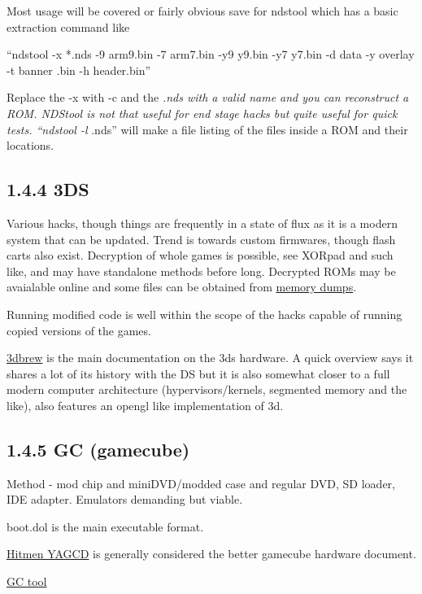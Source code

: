 \documentclass[
]{book}
\begin{document}
Most usage will be covered or fairly obvious save for ndstool which has a basic extraction command like

``ndstool -x *.nds -9 arm9.bin -7 arm7.bin -y9 y9.bin -y7 y7.bin -d data -y overlay -t banner .bin -h header.bin''

Replace the -x with -c and the \emph{.nds with a valid name and you can reconstruct a ROM. NDStool is not that useful for end stage hacks but quite useful for quick tests. ``ndstool -l }.nds'' will make a file listing of the files inside a ROM and their locations.

\hypertarget{ds-1}{%
\subsection{1.4.4 3DS}\label{ds-1}}

Various hacks, though things are frequently in a state of flux as it is a modern system that can be updated. Trend is towards custom firmwares, though flash carts also exist. Decryption of whole games is possible, see XORpad and such like, and may have standalone methods before long. Decrypted ROMs may be avaialable online and some files can be obtained from \href{http://gbatemp.net/threads/3ds-cwav-dumper.361437/}{memory dumps}.

Running modified code is well within the scope of the hacks capable of running copied versions of the games.

\href{http://3dbrew.org/wiki/Main_Page}{3dbrew} is the main documentation on the 3ds hardware. A quick overview says it shares a lot of its history with the DS but it is also somewhat closer to a full modern computer architecture (hypervisors/kernels, segmented memory and the like), also features an opengl like implementation of 3d.

\hypertarget{gc-gamecube}{%
\subsection{1.4.5 GC (gamecube)}\label{gc-gamecube}}

Method - mod chip and miniDVD/modded case and regular DVD, SD loader, IDE adapter. Emulators demanding but viable.

boot.dol is the main executable format.

\href{http://hitmen.c02.at/files/yagcd/yagcd/frames.html}{Hitmen YAGCD} is generally considered the better gamecube hardware document.

\href{http://filetrip.net/wii-downloads/other-files/download-gc-tool-120-beta-f818.html}{GC tool}
\end{document}
